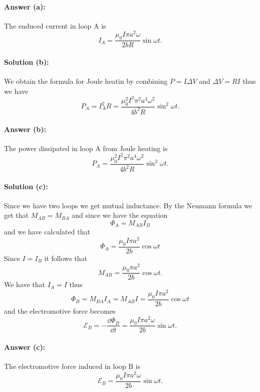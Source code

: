 \paragraph{Answer (a):} The enduced current in loop A is 
\begin{equation}
    I_A = \frac{\mu_0 I \pi a^2\omega}{2 b R} \sin\omega t.
\end{equation}

\paragraph{Solution (b):} We obtain the formula for Joule heatin by combining $P = I \Delta V$ and $\Delta V = RI$ thus we have
\begin{equation}
    P_A = I_A^2 R = \frac{\mu_0^2 I^2 \pi^2 a^4 \omega^2}{4 b^2 R} \sin^2 \omega t.
\end{equation}
\paragraph{Answer (b):} The power dissipated in loop A from Joule heating is
\begin{equation}
    P_A =\frac{\mu_0^2 I^2 \pi^2 a^4 \omega^2}{4 b^2 R} \sin^2 \omega t.
\end{equation}

\paragraph{Solution (c):} Since we have two loops we get mutual inductance. By the Neumann formula we get that $M_{AB} = M_{BA}$ and since we have the equation
\begin{equation}
    \Phi_A = M_{AB} I_B
\end{equation}
and we have calculated that 
\begin{equation}
    \Phi_A = \frac{\mu_0 I \pi a^2}{2b} \cos\omega t
\end{equation}
Since $I = I_B$ it follows that
\begin{equation}
    M_{AB} = \frac{\mu_0 \pi a^2}{2b} \cos\omega t.
\end{equation}
We have that $I_A = I$ thus 
\begin{equation}
    \Phi_B = M_{BA} I_A = M_{AB} I = \frac{\mu_0 I \pi a^2}{2b} \cos\omega t
\end{equation}
and the electromotive force becomes
\begin{equation}
    \mathcal{E}_B = - \frac{\dd \Phi_B}{\dd t} = \frac{\mu_0 I \pi a^2 \omega}{2 b} \sin\omega t.
\end{equation}

\paragraph{Answer (c):} The electromotive force induced in loop B is
\begin{equation}
    \mathcal{E}_B =  \frac{\mu_0 I \pi a^2 \omega}{2 b} \sin\omega t.
\end{equation}